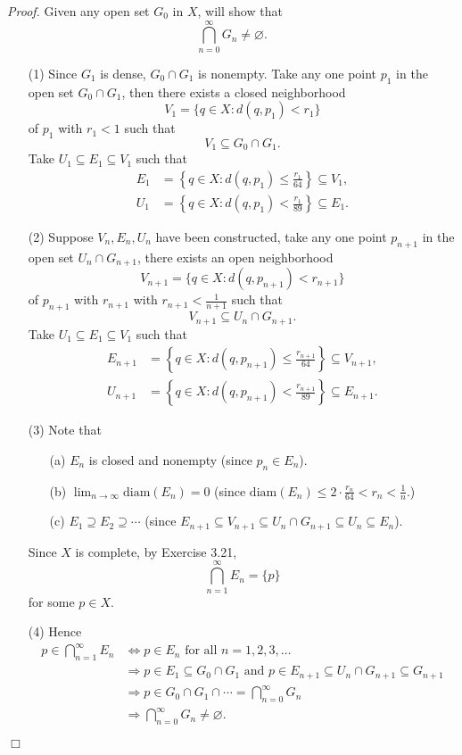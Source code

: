\documentclass{article}
\begin{document}
\emph{Proof.}
Given any open set $G_0$ in $X$,
will show that $$\bigcap_{n=0}^{\infty} G_n \neq \varnothing.$$
\begin{enumerate}
\item[(1)]
Since $G_1$ is dense, $G_0 \cap G_1$ is nonempty.
Take any one point $p_1$ in the open set $G_0 \cap G_1$,
then there exists a closed neighborhood
$$V_1
= \{ q \in X : d(q,p_1) < r_1 \}$$
of $p_1$ with $r_1 < 1$
such that
$$V_1 \subseteq G_0 \cap G_1.$$
Take $U_1 \subseteq E_1 \subseteq V_1$
such that
\begin{align*}
E_1 &= \left\{ q \in X : d(q,p_1) \leq \frac{r_1}{64} \right\} \subseteq V_1, \\
U_1 &= \left\{ q \in X : d(q,p_1) < \frac{r_1}{89} \right\} \subseteq E_1.
\end{align*}
\item[(2)]
Suppose $V_n, E_n, U_n$ have been constructed,
take any one point $p_{n+1}$ in the open set $U_n \cap G_{n+1}$,
there exists an open neighborhood
$$V_{n+1}
= \{ q \in X : d(q,p_{n+1}) < r_{n+1} \}$$
of $p_{n+1}$ with $r_{n+1}$ with $r_{n+1} < \frac{1}{n+1}$
such that
$$V_{n+1} \subseteq U_n \cap G_{n+1}.$$
Take $U_1 \subseteq E_1 \subseteq V_1$
such that
\begin{align*}
E_{n+1} &= \left\{ q \in X : d(q,p_{n+1}) \leq \frac{r_{n+1}}{64} \right\} \subseteq V_{n+1}, \\
U_{n+1} &= \left\{ q \in X : d(q,p_{n+1}) < \frac{r_{n+1}}{89} \right\} \subseteq E_{n+1}.
\end{align*}
\item[(3)]
Note that
  \begin{enumerate}
  \item[(a)]
  $E_n$ is closed and nonempty (since $p_n \in E_n$).
  \item[(b)]
  $\lim_{n \to \infty} \mathrm{diam}(E_n) = 0$
  (since $\mathrm{diam}(E_n) \leq 2 \cdot \frac{r_n}{64} < r_n < \frac{1}{n}$.)
  \item[(c)]
  $E_1 \supseteq E_2 \supseteq \cdots$
  (since
  $E_{n+1} \subseteq V_{n+1} \subseteq U_n \cap G_{n+1} \subseteq U_n \subseteq E_n$).
  \end{enumerate}
Since $X$ is complete, by Exercise 3.21,
$$\bigcap_{n=1}^{\infty} E_n = \{p\}$$
for some $p \in X$.
\item[(4)]
Hence
\begin{align*}
p \in \bigcap_{n=1}^{\infty} E_n
&\Longleftrightarrow
p \in E_n \text{ for all } n=1,2,3,\ldots \\
&\Longrightarrow
p \in E_1 \subseteq G_0 \cap G_1 \text{ and }
p \in E_{n+1} \subseteq U_n \cap G_{n+1} \subseteq G_{n+1} \\
&\Longrightarrow
p \in G_0 \cap G_1 \cap \cdots = \bigcap_{n=0}^{\infty} G_n \\
&\Longrightarrow
\bigcap_{n=0}^{\infty} G_n \neq \varnothing.
\end{align*}
\end{enumerate}
$\Box$ \\\\
\end{document}
